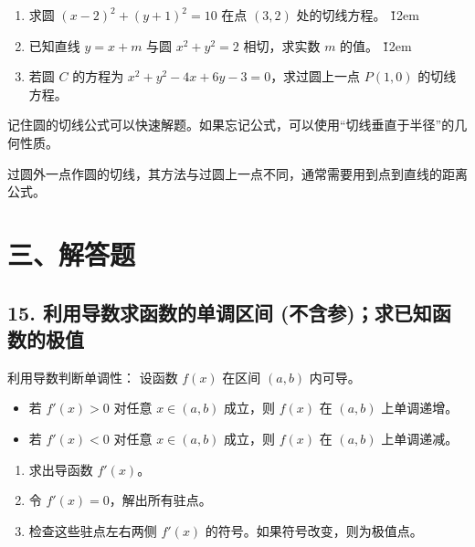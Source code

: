 \begin{problem}
\begin{enumerate}
    \item 求圆 $(x-2)^2 + (y+1)^2 = 10$ 在点 $(3, 2)$ 处的切线方程。
          \v{12em}
    \item 已知直线 $y = x + m$ 与圆 $x^2 + y^2 = 2$ 相切，求实数 $m$ 的值。
          \v{12em}
    \item 若圆 $C$ 的方程为 $x^2 + y^2 - 4x + 6y - 3 = 0$，求过圆上一点 $P(1, 0)$ 的切线方程。
\end{enumerate}
\end{problem}
\begin{tips}
    记住圆的切线公式可以快速解题。如果忘记公式，可以使用“切线垂直于半径”的几何性质。
\end{tips}
\begin{warning}
    过圆外一点作圆的切线，其方法与过圆上一点不同，通常需要用到点到直线的距离公式。
\end{warning}

\section*{三、解答题}

\subsection*{15. 利用导数求函数的单调区间 (不含参)；求已知函数的极值}
\begin{theorem}
    利用导数判断单调性：
    设函数 $f(x)$ 在区间 $(a,b)$ 内可导。

    \begin{itemize}
        \item     若 $f'(x) > 0$ 对任意 $x \in (a,b)$ 成立，则 $f(x)$ 在 $(a,b)$ 上单调递增。
        \item     若 $f'(x) < 0$ 对任意 $x \in (a,b)$ 成立，则 $f(x)$ 在 $(a,b)$ 上单调递减。
    \end{itemize}


    \begin{theorem}[利用导数求极值：]
    \end{theorem}
    \begin{enumerate}
        \item 求出导函数 $f'(x)$。
        \item 令 $f'(x)=0$，解出所有驻点。
        \item 检查这些驻点左右两侧 $f'(x)$ 的符号。如果符号改变，则为极值点。
    \end{enumerate}
\end{theorem}

